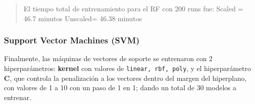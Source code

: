 \documentclass[
  10pt,
]{article}
\begin{document}
\begin{quote}
El tiempo total de entrenamiento para el RF con 200 runs fue: Scaled =
46.7 minutos Unscaled= 46.38 minutos
\end{quote}

\subsubsection{Support Vector Machines
(SVM)}\label{support-vector-machines-svm}

Finalmente, las máquinas de vectores de soporte se entrenaron con 2
hiperparámetros: \textbf{kernel} con valores de
\texttt{linear,\ rbf,\ poly}, y el hiperparámetro \textbf{C}, que
controla la penalización a los vectores dentro del margen del
hiperplano, con valores de 1 a 10 con un paso de 1 en 1; dando un total
de 30 modelos a entrenar.

\begin{table}[!h]
\centering
\caption{\label{tab:grid_SVM}Grid de entrenamiento usada para las Maquinas de soporte de vectores}
\centering
{}
\end{table}
\end{document}
